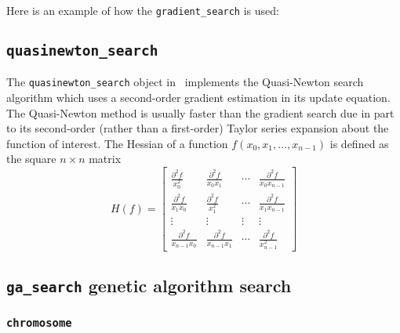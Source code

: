Here is an example of how the {\tt gradient\_search} is used:


\subsection{{\tt quasinewton\_search} }
\label{module:optim:quasinewton_search}
The {\tt quasinewton\_search} object in \liquid\ implements the
Quasi-Newton search algorithm which uses a second-order gradient
estimation in its update equation.
The Quasi-Newton method is usually faster than the gradient search due
in part to its second-order (rather than a first-order) Taylor series
expansion about the function of interest.
The Hessian of a function $f(x_0,x_1,\ldots,x_{n-1})$ is defined as the
square $n \times n$ matrix
%
\begin{equation}
\label{eq:optim:hessian}
    H(f) =
    \begin{bmatrix}
        \frac{\partial^2 f}{x_0^2}  &
        \frac{\partial^2 f}{x_0x_1} &
        \cdots &
        \frac{\partial^2 f}{x_0x_{n-1}} \\
        \frac{\partial^2 f}{x_1x_0} &
        \frac{\partial^2 f}{x_1^2}  &
        \cdots &
        \frac{\partial^2 f}{x_1x_{n-1}} \\
        \vdots &
        \vdots &
        \vdots &
        \vdots \\
        \frac{\partial^2 f}{x_{n-1}x_0} &
        \frac{\partial^2 f}{x_{n-1}x_1}  &
        \cdots &
        \frac{\partial^2 f}{x_{n-1}^2}
    \end{bmatrix}
\end{equation}
%

\subsection{{\tt ga\_search} genetic algorithm search}
\label{module:optim:ga_search}

\subsubsection{{\tt chromosome}}
\label{module:optim:ga_search:chromosome}



